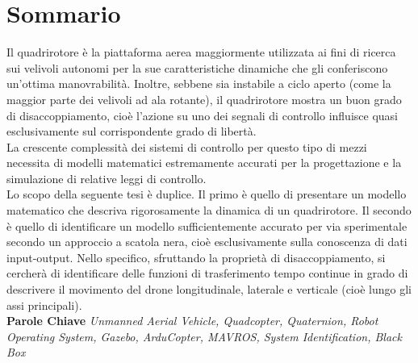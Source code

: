 
\chapter*{Sommario}\label{ch:sommario}
Il quadrirotore è la piattaforma aerea maggiormente utilizzata ai fini di ricerca sui velivoli autonomi per la sue caratteristiche dinamiche che gli conferiscono un'ottima manovrabilità. Inoltre, sebbene sia instabile a ciclo aperto (come la maggior parte dei velivoli ad ala rotante), il quadrirotore mostra un buon grado di disaccoppiamento, cioè l'azione su uno dei segnali di controllo influisce quasi esclusivamente sul corrispondente grado di libertà.\\

La crescente complessità dei sistemi di controllo per questo tipo di mezzi necessita di modelli matematici estremamente accurati per la progettazione e la simulazione di relative leggi di controllo.\\

Lo scopo della seguente tesi è duplice. Il primo è quello di presentare un modello matematico che descriva rigorosamente la dinamica di un quadrirotore. Il secondo è quello di identificare un modello sufficientemente accurato per via sperimentale secondo un approccio a scatola nera, cioè esclusivamente sulla conoscenza di dati input-output. Nello specifico, sfruttando la proprietà di disaccoppiamento, si cercherà di identificare delle funzioni di trasferimento tempo continue in grado di descrivere il movimento del drone longitudinale, laterale e verticale (cioè lungo gli assi principali).\\

\textbf{Parole Chiave} \hspace{3mm} \textit{Unmanned Aerial Vehicle, Quadcopter, Quaternion, Robot Operating System, Gazebo, ArduCopter, MAVROS, System Identification, Black Box}
